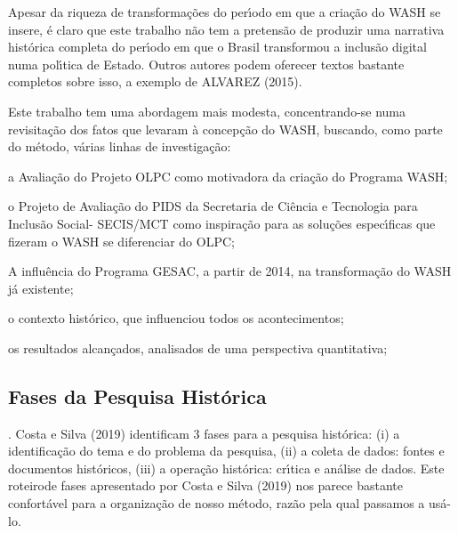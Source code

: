 \documentclass[
12pt,		%
openright,	%
twoside,  %
a4paper,			%
chapter=TITLE,		%
english,			%
french,				%
spanish,			%
brazil				%
]{USPSC-classe/USPSC}
\begin{document}
Apesar da riqueza de transforma\c{c}\~oes do per\'{\i}odo em que a cria\c{c}\~ao do WASH se insere, \'e claro que este trabalho n\~ao tem a pretens\~ao de produzir uma narrativa hist\'orica completa do per\'{\i}odo em que o Brasil transformou a inclus\~ao digital numa pol\'{\i}tica de Estado. Outros autores podem oferecer textos bastante completos sobre isso, a exemplo de  ALVAREZ (2015).










Este trabalho tem uma abordagem mais modesta, concentrando-se numa revisita\c{c}\~ao dos fatos que levaram \`a concep\c{c}\~ao do WASH, buscando, como parte do m\'etodo, v\'arias linhas de investiga\c{c}\~ao:











\begin{alineas}
\item a Avalia\c{c}\~ao do Projeto OLPC como motivadora da cria\c{c}\~ao do Programa WASH;
\item o Projeto de Avalia\c{c}\~ao do PIDS da Secretaria de Ci\^encia e Tecnologia para Inclus\~ao Social- SECIS/MCT como inspira\c{c}\~ao para as solu\c{c}\~oes espec\'{\i}ficas que fizeram o WASH se diferenciar do OLPC;
\item A influ\^encia do Programa GESAC, a partir de 2014, na transforma\c{c}\~ao do WASH j\'a existente;
\item o contexto hist\'orico, que influenciou todos os acontecimentos;
\item os resultados alcan\c{c}ados, analisados de uma perspectiva quantitativa;
\end{alineas}

\subsection[Fases da Pesquisa Hist\'orica]{Fases da Pesquisa Hist\'orica}\label{Fases da Pesquisa Hist\'orica}
. Costa e Silva (2019) identificam 3 fases para a pesquisa hist\'orica: (i) a identifica\c{c}\~ao do tema e do problema da pesquisa, (ii) a coleta de dados: fontes e documentos hist\'oricos, (iii) a opera\c{c}\~ao hist\'orica: cr\'{\i}tica e an\'alise de dados. Este \textquotedbl roteiro\textquotedbl  de fases apresentado por  Costa e Silva (2019) nos parece bastante confort\'avel para a organiza\c{c}\~ao de nosso m\'etodo, raz\~ao pela qual passamos a us\'a-lo.
\end{document}
